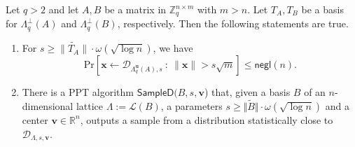\documentclass[runningheads]{llncs}
\def\ZZ{\mathbb{Z}}
\def\cal{\mathcal}
\def\bf{\mathbf}
\def\calL{\mathcal{L}}
\def\SampleLeft{\mathsf{SampleLeft}}
\def\SampleRight{\mathsf{SampleRight}}
\def\Pr{\mathrm{Pr}}
\def\u{\bf{u}}
\def\e{\bf{e}}
\def\x{\bf{x}}
\def\L{\Lambda}
\def\Lp{\Lambda^{\perp}}
\def\s{\bf{s}}
\def\DuA{\cal{D}_{\L_q^{\u}(A),s}}
\begin{document}
\begin{theorem}\label{thm:Gauss}
	Let $q> 2$ and let $A, B$ be a matrix in $\ZZ_q^{n\times m}$ with $m>n$. 
	Let $T_A, T_B$ be a basis for $\Lp_q(A)$ and  $\Lp_q(B)$, respectively. 
	Then the following statements are true.
		\begin{enumerate}
	
		    \item {\cite[Lemma 4.4]{MR04}} For $s\geq\|\widetilde{T_A}\|\cdot  \omega(\sqrt{\log n})$, we have $$\Pr[\x\gets\DuA~:~\|\x\|>s\sqrt{m}]\leq\mathsf{negl}(n).$$
		
		
		
	\item \cite[Theorem 4.1]{GPV08} There is a PPT algorithm $\mathsf{SampleD}(B, s, \mathbf{v}$) that, given a basis $B$ of an $n$-dimensional lattice $\L:=\calL(B)$, a parameters $s \geq \Vert \widetilde{B} \Vert \cdot \omega(\sqrt{\log n})$ and a center $\mathbf{v} \in \mathbb{R}^n$, outputs a sample from a distribution statistically close to  $\cal{D}_{\L,s,\mathbf{v}}$.
	
	



\end{enumerate}
\end{theorem}
\end{document}
